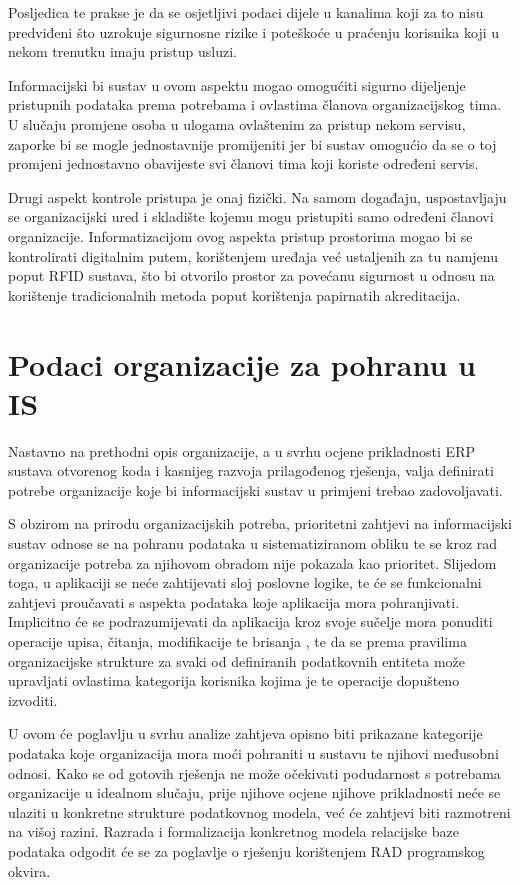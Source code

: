 \documentclass[times, utf8, diplomski]{fer}
\begin{document}
Posljedica te prakse je da se osjetljivi podaci dijele u kanalima koji za to
nisu predviđeni što uzrokuje sigurnosne rizike i poteškoće u praćenju korisnika
koji u nekom trenutku imaju pristup usluzi.

Informacijski bi sustav u ovom aspektu mogao omogućiti sigurno dijeljenje
pristupnih podataka prema potrebama i ovlastima članova organizacijskog tima. U
slučaju promjene osoba u ulogama ovlaštenim za pristup nekom servisu, zaporke bi
se mogle jednostavnije promijeniti jer bi sustav omogućio da se o toj promjeni
jednostavno obavijeste svi članovi tima koji koriste određeni servis.

Drugi aspekt kontrole pristupa je onaj fizički. Na samom događaju, uspostavljaju
se organizacijski ured i skladište kojemu mogu pristupiti samo određeni članovi
organizacije. Informatizacijom ovog aspekta pristup prostorima mogao bi se
kontrolirati digitalnim putem, korištenjem uređaja već ustaljenih za tu namjenu
poput RFID sustava, što bi otvorilo prostor za povećanu sigurnost u odnosu na
korištenje tradicionalnih metoda poput korištenja papirnatih akreditacija.

\chapter{Podaci organizacije za pohranu u IS} \label{reqs}

Nastavno na prethodni opis organizacije, a u svrhu ocjene prikladnosti ERP
sustava otvorenog koda i kasnijeg razvoja prilagođenog rješenja, valja
definirati potrebe organizacije koje bi informacijski sustav u primjeni trebao
zadovoljavati.

S obzirom na prirodu organizacijskih potreba, prioritetni zahtjevi na
informacijski sustav odnose se na pohranu podataka u sistematiziranom obliku te
se kroz rad organizacije potreba za njihovom obradom nije pokazala kao
prioritet. Slijedom toga, u aplikaciji se neće zahtijevati sloj poslovne
logike, te će se funkcionalni zahtjevi proučavati s aspekta podataka koje
aplikacija mora pohranjivati. Implicitno će se podrazumijevati da aplikacija
kroz svoje sučelje mora ponuditi operacije upisa, čitanja, modifikacije te
brisanja , te da se prema pravilima organizacijske strukture za svaki
od definiranih podatkovnih entiteta može upravljati ovlastima kategorija
korisnika kojima je te operacije dopušteno izvoditi.

U ovom će poglavlju u svrhu analize zahtjeva opisno biti prikazane kategorije
podataka koje organizacija mora moći pohraniti u sustavu te njihovi međusobni
odnosi. Kako se od gotovih rješenja ne može očekivati podudarnost s potrebama
organizacije u idealnom slučaju, prije njihove ocjene njihove prikladnosti neće
se ulaziti u konkretne strukture podatkovnog modela, već će zahtjevi biti
razmotreni na višoj razini. Razrada i formalizacija konkretnog modela relacijske
baze podataka odgodit će se za poglavlje o rješenju korištenjem RAD programskog okvira.
\end{document}
